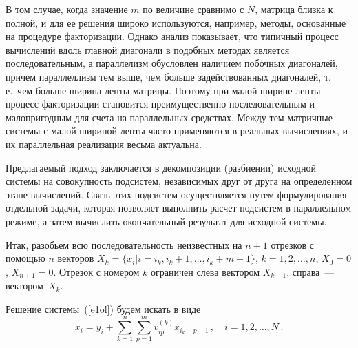 \begin{multicols}{2}
     В том случае, когда значение $m$ по величине сравнимо с $N$, матрица
близка к полной, и для ее решения широко используются, например, методы,
основанные на процедуре факторизации. Однако анализ показывает, что
типичный процесс вы\-чис\-ле\-ний вдоль главной диагонали в подобных методах
является последовательным, а параллелизм обусловлен наличием побочных
диагоналей, причем параллеллизм тем выше, чем больше задействованных
диагоналей, т.\,е.\ чем больше ширина ленты матрицы. Поэтому при малой
ширине ленты процесс факторизации становится преимущественно
последовательным и малопригодным для счета на параллельных средствах.
Между тем матричные системы с малой шириной ленты часто применяются в
реальных вычислениях, и их параллельная реализация весьма актуальна.

     Предлагаемый подход заключается в декомпозиции (разбиении)
исходной системы на совокупность подсистем, независимых друг от друга на
определенном этапе вычислений. Связь этих подсистем осуществляется путем
формулирования отдельной задачи, которая позволяет выполнить расчет
подсистем в параллельном режиме, а затем вычислить окончательный
результат для исходной сис\-те\-мы.

     
     Итак, разобьем всю последовательность неизвестных на $n + 1$
отрезков с помощью $n$ векторов $X_k = \{ x_i | i = i_k, i_k + 1,\ldots , i_k + m -
1\}$,  $k = 1, 2,\ldots , n$, $X_0 = 0$, $X_{n+1} = 0$. Отрезок с номером $k$
ограничен слева вектором $X_{k-1}$, справа~--- вектором~$X_k$.


     Решение системы~(\ref{e1ol}) будем искать в виде
     \begin{equation}
        x_i = y_i +\sum\limits_{k=1}^n\sum\limits_{p=1}^m v_{ip}^{(k)}
x_{i_k+p-1}\,,\quad i=1, 2, \ldots , N\,.
     \label{e2ol}
     \end{equation}
 

\end{multicols}

